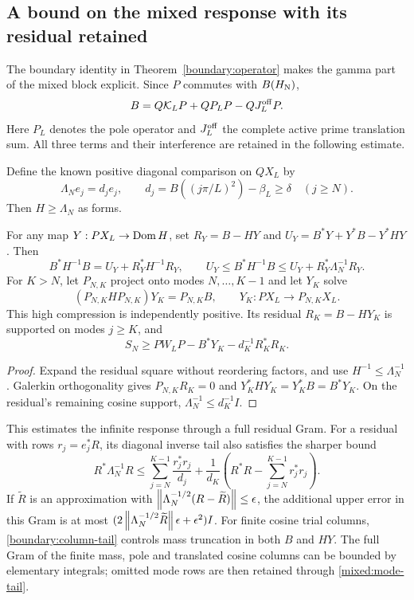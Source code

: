 \subsection{A bound on the mixed response with its residual retained}
The boundary identity in Theorem~\ref{boundary:operator} makes the
gamma part of the mixed block explicit. Since $P$ commutes with
$B(H_{\rm N})$,
\begin{equation}\label{mixed:boundary}
B=Q\mathcal K_LP+QP_LP-QJ_L^{\rm off}P.
\end{equation}
Here $P_L$ denotes the pole operator and $J_L^{\rm off}$ the complete
active prime translation sum. All three terms and their interference
are retained in the following estimate.

Define the known positive diagonal comparison on $QX_L$ by
\[
\Lambda_Ne_j=d_je_j,\qquad
d_j=B((j\pi/L)^2)-\beta_L\ge\delta\quad(j\ge N).
\]
Then $H\ge\Lambda_N$ as forms.
\begin{proposition}\label{mixed:residual}
For any map $Y:PX_L\to\operatorname{Dom} H$, set
$R_Y=B-HY$ and $U_Y=B^*Y+Y^*B-Y^*HY$. Then
\begin{equation}\label{mixed:identity}
B^*H^{-1}B=U_Y+R_Y^*H^{-1}R_Y,
\qquad
U_Y\le B^*H^{-1}B\le U_Y+R_Y^*\Lambda_N^{-1}R_Y.
\end{equation}
For $K>N$, let $P_{N,K}$ project onto modes $N,\ldots,K-1$ and
let $Y_K$ solve
\[
(P_{N,K}HP_{N,K})Y_K=P_{N,K}B,
\qquad Y_K:PX_L\longrightarrow P_{N,K}X_L.
\]
This high compression is independently positive. Its residual
$R_K=B-HY_K$ is supported on modes $j\ge K$, and
\begin{equation}\label{mixed:certificate}
S_N\ge PW_LP-B^*Y_K-d_K^{-1}R_K^*R_K.
\end{equation}
\end{proposition}
\begin{proof}
Expand the residual square without reordering factors, and use
$H^{-1}\le\Lambda_N^{-1}$. Galerkin orthogonality gives
$P_{N,K}R_K=0$ and
$Y_K^*HY_K=Y_K^*B=B^*Y_K$. On the residual's remaining cosine
support, $\Lambda_N^{-1}\le d_K^{-1}I$.
\end{proof}
This estimates the infinite response through a full residual Gram.
For a residual with rows $r_j=e_j^*R$, its diagonal inverse tail
also satisfies the sharper bound
\begin{equation}\label{mixed:mode-tail}
R^*\Lambda_N^{-1}R\le
\sum_{j=N}^{K-1}\frac{r_j^*r_j}{d_j}
+\frac1{d_K}\left(R^*R-\sum_{j=N}^{K-1}r_j^*r_j\right).
\end{equation}
If $\widetilde R$ is an approximation with
$\left\lVert\Lambda_N^{-1/2}(R-\widetilde R)\right\rVert\le\epsilon$, the additional
upper error in this Gram is at most
$(2\left\lVert\Lambda_N^{-1/2}\widetilde R\right\rVert\epsilon+\epsilon^2)I$.
For finite cosine trial columns, \eqref{boundary:column-tail}
controls mass truncation in both $B$ and $HY$.
The full Gram of the finite mass, pole and translated cosine
columns can be bounded by elementary integrals; omitted mode
rows are then retained through \eqref{mixed:mode-tail}.

